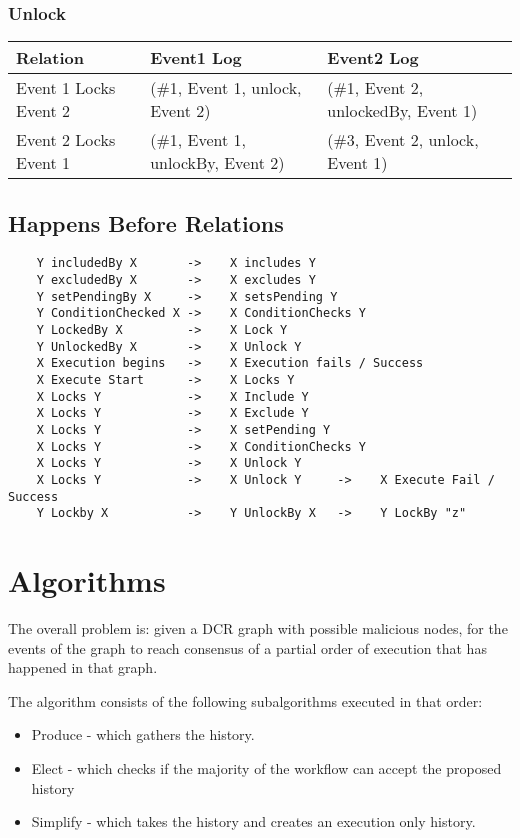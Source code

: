 \subsection{Unlock}
\begin{tabularx}{\linewidth}{ | X | X | X | }
  \hline
  Relation & Event1 Log & Event2 Log \\
  \hline
  Event 1 Locks Event 2 & (\#1, Event 1, unlock, Event 2) & (\#1, Event 2, unlockedBy, Event 1) \\
  \hline
  Event 2 Locks Event 1 & (\#1, Event 1, unlockBy, Event 2) & (\#3, Event 2, unlock, Event 1) \\
  \hline
\end{tabularx}

\section{Happens Before Relations}

\begin{lstlisting}
    Y includedBy X       ->    X includes Y
    Y excludedBy X       ->    X excludes Y
    Y setPendingBy X     ->    X setsPending Y
    Y ConditionChecked X ->    X ConditionChecks Y
    Y LockedBy X         ->    X Lock Y
    Y UnlockedBy X       ->    X Unlock Y
    X Execution begins   ->    X Execution fails / Success
    X Execute Start      ->    X Locks Y
    X Locks Y            ->    X Include Y
    X Locks Y            ->    X Exclude Y
    X Locks Y            ->    X setPending Y
    X Locks Y            ->    X ConditionChecks Y
    X Locks Y            ->    X Unlock Y
    X Locks Y            ->    X Unlock Y     ->    X Execute Fail / Success
    Y Lockby X           ->    Y UnlockBy X   ->    Y LockBy "z"
\end{lstlisting}

\chapter{Algorithms}
The overall problem is: given a DCR graph with possible malicious nodes, for the events of the graph to reach consensus of a partial order of execution that has happened in that graph.

The algorithm consists of the following subalgorithms executed in that order:
\begin{itemize}
    \item Produce - which gathers the history.
    \item Elect - which checks if the majority of the workflow can accept the proposed history
    \item Simplify - which takes the history and creates an execution only history.
\end{itemize}

